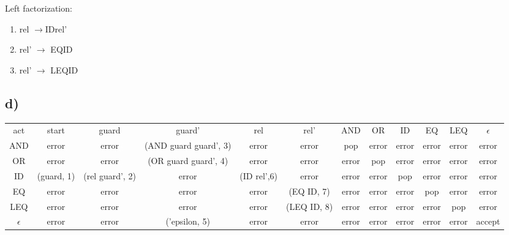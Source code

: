 Left factorization:

\begin{enumerate}
\item rel $\rightarrow$\;ID\;rel'
\item rel' $\rightarrow$ EQ\;ID
\item rel' $\rightarrow$ LEQ\;ID
\end{enumerate}


\subsection*{d)}

\begin{footnotesize}

\begin{tabular}{ *{12}{|@{\hspace{2pt}}c@{\hspace{2pt}}} }
act & start & guard & guard' & rel & rel' & AND & OR & ID & EQ & LEQ & $\epsilon$	\\
AND	&error	&error&	(AND guard guard', 3)	&error	&error	&pop	&error	&error	&error	&error	&error	\\
OR	&error	&error&	(OR guard guard', 4)	&error	&error	&error	&pop	&error	&error	&error	&error	\\
ID	&(guard, 1)	&(rel guard', 2)	&error	&(ID rel',6)	&error	&error	&error	&pop	&error	&error	&error	\\
EQ	&error	&error	&error	&error	&(EQ ID, 7)&	error&	error&	error&	pop	&error	&error	\\
LEQ	&error	&error	&error	&error&	(LEQ ID, 8)	&error	&error&	error	&error&	pop&	error	\\
$\epsilon$	&error	&error	&('epsilon, 5)&	error	&error&	error&	error&	error&	error	&error	&accept
\end{tabular}
\end{footnotesize}

